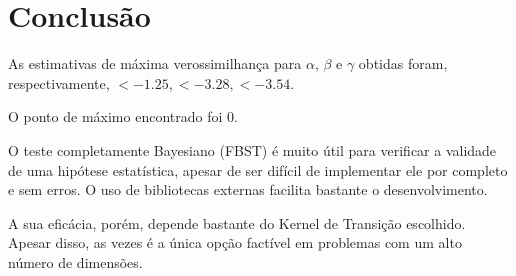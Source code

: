 \documentclass[a4paper]{article}
\begin{document}
\section{Conclusão}

As estimativas de máxima verossimilhança para $\alpha$, $\beta$ e $\gamma$ obtidas foram, respectivamente, $<- 1.25, <- 3.28, <- 3.54$.

O ponto de máximo encontrado foi 0.

O teste completamente Bayesiano (FBST) é muito útil para verificar a validade
de uma hipótese estatística, apesar de ser difícil de implementar ele por
completo e sem erros. O uso de bibliotecas externas facilita bastante o
desenvolvimento.

A sua eficácia, porém, depende bastante do Kernel de Transição escolhido.
Apesar disso, as vezes é a única opção factível em problemas com um alto número
de dimensões.
\end{document}
